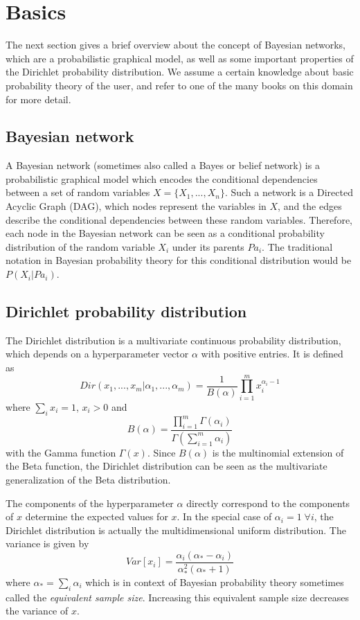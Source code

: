 \documentclass{article}
\begin{document}
\section{Basics}
	The next section gives a brief overview about the concept of Bayesian networks, which are a probabilistic
	graphical model, as well as some important properties of the Dirichlet probability distribution.
	We assume a certain knowledge about basic probability theory of the user, and refer to one of the many
	books on this domain for more detail.
	
	\subsection{Bayesian network}
	A Bayesian network (sometimes also called a Bayes or belief network) is a probabilistic graphical model
	which encodes the conditional dependencies between a set of random variables $X=\{X_1,..., X_n\}$.
	Such a network	is a Directed Acyclic Graph (DAG), which nodes represent the variables in $X$, and the edges 
	describe the conditional
	dependencies between these random variables. Therefore, each node in the Bayesian network can be seen as a 
	conditional probability distribution of the random variable $X_i$ under its parents $Pa_i$.
	The traditional notation in Bayesian probability theory for this conditional distribution
	would be $P(X_i|Pa_i)$.
	
	\subsection{Dirichlet probability distribution}
	The Dirichlet distribution is a multivariate continuous probability distribution, which depends on a
	hyperparameter vector $\alpha$ with positive entries. It is defined as
	\[
		Dir(x_1,...,x_m|\alpha_1, ..., \alpha_{m})=\frac{1}{B(\alpha)}\prod_{i=1}^m x_i^{\alpha_i -1}
	\]
	where $\sum_i x_i = 1$, $x_i>0$ and 
	\[
		B(\alpha)=\frac{\prod_{i=1}^m\Gamma(\alpha_i)}{\Gamma(\sum_{i=1}^m \alpha_i)}
	\]
	with the Gamma function $\Gamma(x)$. Since $B(\alpha)$ is the multinomial extension of the Beta function,
	the Dirichlet distribution can be seen as the	multivariate generalization of the Beta distribution.
	
	The components of the hyperparameter $\alpha$ directly correspond to the components of $x$ determine
	the expected values for $x$. In the special case of $\alpha_i = 1 \; \forall i$, the Dirichlet distribution
	is actually the multidimensional uniform distribution. The variance is given by
	\[
		Var[x_i] = \frac{\alpha_i(\alpha_*-\alpha_i)}{\alpha_*^2(\alpha_* + 1)}
	\]
	where $\alpha_* = \sum_i \alpha_i$ which is in context of Bayesian probability theory sometimes
	called the \textit{equivalent sample size}. Increasing this equivalent sample size decreases the
	variance of $x$.
	
\end{document}
